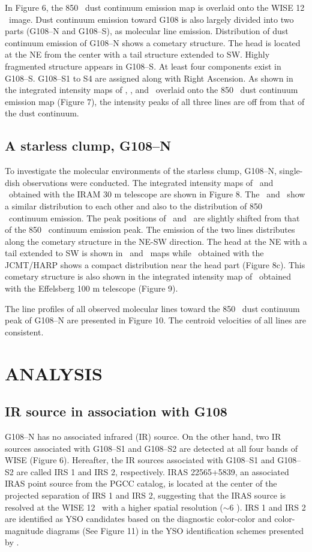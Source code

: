\documentclass[manuscript]{aastex}
\begin{document}
In Figure 6, the 850 \m\ dust continuum emission map is overlaid onto the WISE 12 \m\ image.
Dust continuum emission toward G108 is also largely divided into two parts (G108--N and G108--S), as molecular line emission.
Distribution of dust continuum emission of G108--N shows a cometary structure.
The head is located at the NE from the center with a tail structure extended to SW.
Highly fragmented structure appears in G108--S.
At least four components exist in G108--S.
G108--S1 to S4 are assigned along with Right Ascension.
As shown in the integrated intensity maps of \tcot, \thcot, and \ceot\ overlaid onto the 850 \m\ dust continuum emission map (Figure 7), the intensity peaks of all three lines are off from that of the dust continuum.


\subsection{A starless clump, G108--N}
To investigate the molecular environments of the starless clump, G108--N, single-dish observations were conducted.
The integrated intensity maps of \hcop\ and \hcn\ obtained with the IRAM 30 m telescope are shown in Figure 8.
The \hcop\ and \hcn\ show a similar distribution to each other and also to the distribution of 850 \m\ continuum emission.
The peak positions of \hcop\ and \hcn\ are slightly shifted from that of the 850 \m\ continuum emission peak.
The emission of the two lines distributes along the cometary structure in the NE-SW direction.
The head at the NE with a tail extended to SW is shown in \hcop\ and \hcn\ maps while \hcopf\ obtained with the JCMT/HARP shows a compact distribution near the head part (Figure 8c).
This cometary structure is also shown in the integrated intensity map of \nht\ obtained with the Effelsberg 100 m telescope (Figure 9).


The line profiles of all observed molecular lines toward the 850 \m\ dust continuum peak of G108--N are presented in Figure 10.
The centroid velocities of all lines are consistent.

\section{ANALYSIS}

\subsection{IR source in association with G108}
G108--N has no associated infrared (IR) source.
On the other hand, two IR sources associated with G108--S1 and G108--S2 are detected at all four bands of WISE (Figure 6).
Hereafter, the IR sources associated with G108--S1 and G108--S2 are called IRS 1 and IRS 2, respectively.
IRAS 22565+5839, an associated IRAS point source from the PGCC catalog, is located at the center of the projected separation of IRS 1 and IRS 2, suggesting that the IRAS source is resolved at the WISE 12 \m\ with a higher spatial resolution ($\sim$6 \arcsec).
IRS 1 and IRS 2 are identified as YSO candidates based on the diagnostic color-color and color-magnitude diagrams (See Figure 11) in the YSO identification schemes presented by \citet{koenig14}.
\end{document}
